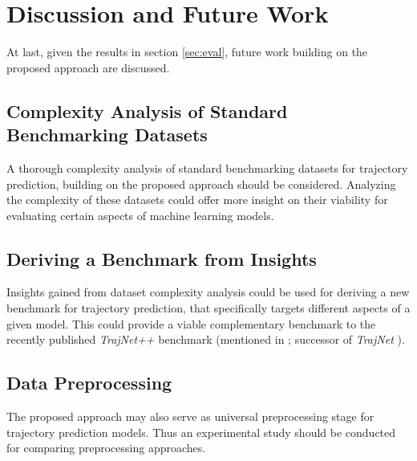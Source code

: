 \documentclass[letterpaper, 10 pt, conference]{ieeeconf}  %
\begin{document}
\section{Discussion and Future Work}
At last, given the results in section \ref{sec:eval}, future work building on the proposed approach are discussed.

\subsection{Complexity Analysis of Standard Benchmarking Datasets}
A thorough complexity analysis of standard benchmarking datasets for trajectory prediction, building on the proposed approach should be considered.
Analyzing the complexity of these datasets could offer more insight on their viability for evaluating certain aspects of machine learning models.

\subsection{Deriving a Benchmark from Insights}
Insights gained from dataset complexity analysis could be used for deriving a new benchmark for trajectory prediction, that specifically targets different aspects of a given model.
This could provide a viable complementary benchmark to the recently published \emph{TrajNet++} benchmark (mentioned in \cite{rudenko2019human}; successor of \emph{TrajNet} \cite{sadeghiankosaraju2018trajnet}).

\subsection{Data Preprocessing}
The proposed approach may also serve as universal preprocessing stage for trajectory prediction models.
Thus an experimental study should be conducted for comparing preprocessing approaches.


\addtolength{\textheight}{-12cm}   %




\end{document}
